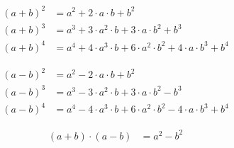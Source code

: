 
\begin{shaded}
 \begin{align}
  \left(a+b\right)^2 & =a^2+2\cdot a\cdot b+b^2\\
  \left(a+b\right)^3 & =a^3+3\cdot a^2\cdot b+3\cdot a\cdot b^2+b^3\\
  \left(a+b\right)^4 & =a^4+4\cdot a^3\cdot b+6\cdot a^2\cdot b^2+4\cdot a\cdot b^3+b^4
 \end{align}
\end{shaded}\begin{shaded}
 \begin{align}
  \left(a-b\right)^2 & =a^2-2\cdot a\cdot b+b^2\\
  \left(a-b\right)^3 & =a^3-3\cdot a^2\cdot b+3\cdot a\cdot b^2-b^3\\
  \left(a-b\right)^4 & =a^4-4\cdot a^3\cdot b+6\cdot a^2\cdot b^2-4\cdot a\cdot b^3+b^4 
\end{align}
\end{shaded}\begin{shaded}
 \begin{align}
\left(a+b\right)\cdot\left(a-b\right) & = a^2-b^2
 \end{align}
\end{shaded}

